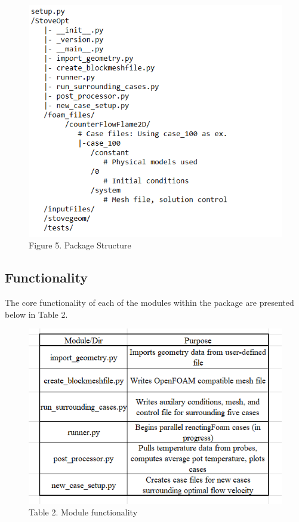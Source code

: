 \documentclass[3p,times,twocolumn]{elsarticle}
\begin{document}
\begin{figure}{\linewidth}
	\includegraphics[width=\linewidth]{skeleton.PNG}
	\caption{Figure 5. Package Structure}
\end{figure}

\subsection{Functionality}
The core functionality of each of the modules within the package are presented below in Table 2. 

\begin{figure}{\linewidth}
	\includegraphics[width=\linewidth]{functionality.PNG}
	\caption{Table 2. Module functionality}
\end{figure}
\end{document}
